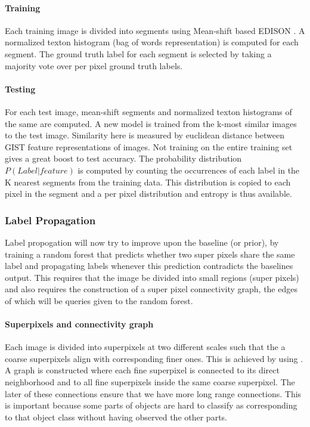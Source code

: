\documentclass{article} %
\begin{document}
\paragraph{Training} Each training image is divided into segments using
Mean-shift based EDISON \cite{meanshift}.
A normalized texton histogram (bag of words representation) is computed for each segment.
The ground truth label for each segment is selected by taking a majority vote over per pixel ground truth labels.

\paragraph{Testing} For each test image, mean-shift segments and normalized texton histograms of the same are computed.
A new model is trained from the k-most similar images to the test image. Similarity here is measured by euclidean distance between GIST \cite{Gist} feature representations of images. Not training on the entire training set gives a great boost to test accuracy.
The probability distribution $P(Label | feature)$ is computed by counting the occurrences of each label in the K nearest segments from the training data.
This distribution is copied to each pixel in the segment and a per pixel distribution and entropy is thus available.

\subsubsection{Label Propagation}
Label propogation will now try to improve upon the baseline (or prior), by training a random forest that predicts whether two super pixels share the same label and propagating labels whenever this prediction contradicts the baselines output.
This requires that the image be divided into small regions (super pixels) and also requires the construction of a super pixel connectivity graph, the edges of which will be queries given to the random forest.
\paragraph{Superpixels and connectivity graph}
\label{sec:labprop}
Each image is divided into superpixels at two different scales such that
the a coarse superpixels align with corresponding finer ones.
This is achieved by using \cite{supix}.
A graph is constructed where each fine superpixel is connected to its
direct neighborhood and to all fine superpixels inside the same
coarse superpixel.
The later of these connections ensure that we have more long range connections. This is important because some parts of objects are hard to classify as corresponding to that object class without having observed the other parts.
\end{document}
